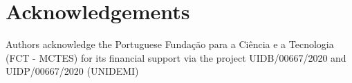 \documentclass[3p,times,procedia]{elsarticle}
\begin{document}


%
%




\section*{Acknowledgements}
Authors acknowledge the Portuguese Fundação para a Ciência e a Tecnologia (FCT -
MCTES) for its financial support via the project UIDB/00667/2020 and UIDP/00667/2020 (UNIDEMI)
\end{document}
